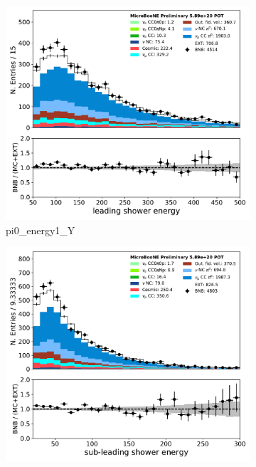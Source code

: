 \begin{figure}[H] 
\begin{center}
    \begin{subfigure}[b]{0.3\textwidth}
    \centering
    \includegraphics[width=1.00\textwidth]{pi0/inputs/pi0_energy1_Y_03182020_presel.pdf}
    \caption{\label{fig:pi0:inputs:energy1:RUN1} pi0\_energy1\_Y}
    \end{subfigure}
    \begin{subfigure}[b]{0.3\textwidth}
    \centering
    \includegraphics[width=1.00\textwidth]{pi0/inputs/pi0_energy2_Y_03182020_presel.pdf}

\end{subfigure}
\end{center}
\end{figure}
